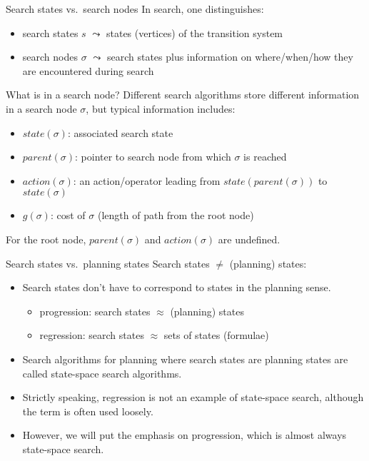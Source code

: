 \documentclass{gkibeamer}
\begin{document}
\begin{frame}{Search states vs.\ search nodes}
  In search, one distinguishes:
  \begin{itemize}
  \item \alert{search states} \alert{$s$} $\leadsto$ states
    (vertices) of the transition system
  \item \alert{search nodes} \alert{$\sigma$} $\leadsto$ search
    states plus information on where/when/how they are encountered
    during search
  \end{itemize}

  \begin{block}{What is in a search node?}
    Different search algorithms store different information in a
    search node $\sigma$, but typical information includes:
    \begin{itemize}
    \item \alert{$\textit{state}(\sigma)$:} associated search state
    \item \alert{$\textit{parent}(\sigma)$:} pointer to search node
      from which $\sigma$ is reached
    \item \alert{$\textit{action}(\sigma)$:} an action/operator
      leading from $\textit{state}(\textit{parent}(\sigma))$ to
      $\textit{state}(\sigma)$
    \item \alert{$g(\sigma)$:} cost of $\sigma$ (length of path from
      the root node)
    \end{itemize}
    For the root node, $\textit{parent}(\sigma)$ and
    $\textit{action}(\sigma)$ are undefined.
  \end{block}
\end{frame}

\begin{frame}{Search states vs.\ planning states}
  Search states $\neq$ (planning) states:
  \begin{itemize}
  \item \alert{Search states} don't have to correspond to
    \alert{states} in the planning sense.
    \begin{itemize}
    \item progression: search states $\approx$ \alert{(planning)
      states}
    \item regression: search states $\approx$ \alert{sets of
      states} (formulae)
    \end{itemize}
  \item Search algorithms for planning where search states are
    planning states are called \alert{state-space search}
    algorithms.
  \item Strictly speaking, regression is \alert{not} an example of
    state-space search, although the term is often used loosely.
  \item However, we will put the emphasis on progression, which is
    almost always state-space search.
  \end{itemize}
\end{frame}
\end{document}
